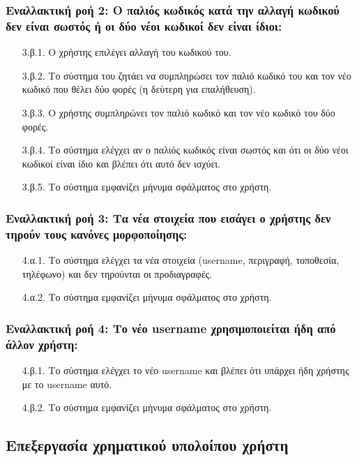 \documentclass[12pt,a4paper]{article}
\begin{document}
\subsubsection*{Εναλλακτική ροή 2: Ο παλιός κωδικός κατά την αλλαγή κωδικού δεν είναι σωστός ή οι δύο νέοι κωδικοί δεν είναι ίδιοι:}
\begin{enumerate}
    \item [3.β.1.] Ο χρήστης επιλέγει αλλαγή του κωδικού του.
    \item [3.β.2.] Το σύστημα του ζητάει να συμπληρώσει τον παλιό κωδικό του και τον νέο κωδικό που θέλει δύο φορές (η δεύτερη για επαλήθευση).
    \item [3.β.3.] Ο χρήστης συμπληρώνει τον παλιό κωδικό και τον νέο κωδικό του δύο φορές.
    \item [3.β.4.] Το σύστημα ελέγχει αν ο παλιός κωδικός είναι σωστός και ότι οι δύο νέοι κωδικοί είναι ίδιο και βλέπει ότι αυτό δεν ισχύει.
    \item [3.β.5.] Το σύστημα εμφανίζει μήνυμα σφάλματος στο χρήστη.  
\end{enumerate}

\subsubsection*{Εναλλακτική ροή 3: Τα νέα στοιχεία που εισάγει ο χρήστης δεν τηρούν τους κανόνες μορφοποίησης:}
\begin{enumerate}
    \item [4.α.1.] Το σύστημα ελέγχει τα νέα στοιχεία (username, περιγραφή, τοποθεσία, τηλέφωνο) και δεν τηρούνται οι προδιαγραφές.
    \item [4.α.2.] Το σύστημα εμφανίζει μήνυμα σφάλματος στο χρήστη.
\end{enumerate}

\subsubsection*{Εναλλακτική ροή 4: Το νέο username χρησιμοποιείται ήδη από άλλον χρήστη:}
\begin{enumerate}
    \item [4.β.1.] Το σύστημα ελέγχει το νέο username και βλέπει ότι υπάρχει ήδη χρήστης με το username αυτό. 
    \item [4.β.2.] Το σύστημα εμφανίζει μήνυμα σφάλματος στο χρήστη.  
\end{enumerate}

\subsection{Επεξεργασία χρηματικού υπολοίπου χρήστη}
\end{document}
